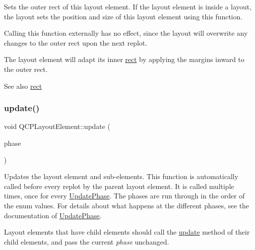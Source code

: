 Sets the outer rect of this layout element. If the layout element is inside a layout, the layout sets the position and size of this layout element using this function.

Calling this function externally has no effect, since the layout will overwrite any changes to the outer rect upon the next replot.

The layout element will adapt its inner \mbox{\hyperlink{class_q_c_p_layout_element_a208effccfe2cca4a0eaf9393e60f2dd4}{rect}} by applying the margins inward to the outer rect.

\begin{DoxySeeAlso}{See also}
\mbox{\hyperlink{class_q_c_p_layout_element_a208effccfe2cca4a0eaf9393e60f2dd4}{rect}} 
\end{DoxySeeAlso}
\mbox{\label{class_q_c_p_layout_element_a929c2ec62e0e0e1d8418eaa802e2af9b}} 
\subsubsection{\texorpdfstring{update()}{update()}}
{\footnotesize\ttfamily void Q\+C\+P\+Layout\+Element\+::update (\begin{DoxyParamCaption}\item[{\mbox{\hyperlink{class_q_c_p_layout_element_a0d83360e05735735aaf6d7983c56374d}{Update\+Phase}}}]{phase }\end{DoxyParamCaption})\hspace{0.3cm}{\ttfamily [virtual]}}

Updates the layout element and sub-\/elements. This function is automatically called before every replot by the parent layout element. It is called multiple times, once for every \mbox{\hyperlink{class_q_c_p_layout_element_a0d83360e05735735aaf6d7983c56374d}{Update\+Phase}}. The phases are run through in the order of the enum values. For details about what happens at the different phases, see the documentation of \mbox{\hyperlink{class_q_c_p_layout_element_a0d83360e05735735aaf6d7983c56374d}{Update\+Phase}}.

Layout elements that have child elements should call the \mbox{\hyperlink{class_q_c_p_layout_element_a929c2ec62e0e0e1d8418eaa802e2af9b}{update}} method of their child elements, and pass the current {\itshape phase} unchanged.

